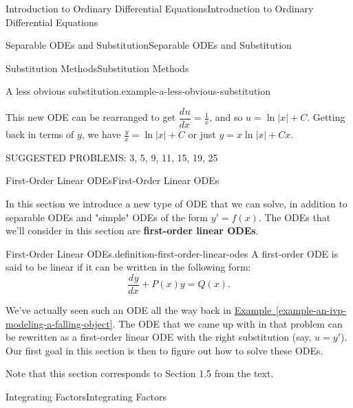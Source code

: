 \documentclass[10pt,]{book}
\newcommand{\terminology}[1]{\textbf{#1}}
\numberwithin{equation}{section}
\newcommand{\dv}[3][]{\dfrac{d^{#1} #2}{d #3^{#1}}}
\begin{document}
\begin{chapterptx}{Introduction to Ordinary Differential Equations}{}{Introduction to Ordinary Differential Equations}{}{}
\begin{sectionptx}{Separable ODEs and Substitution}{}{Separable ODEs and Substitution}{}{}
\begin{subsectionptx}{Substitution Methods}{}{Substitution Methods}{}{}
\begin{example}{A less obvious substitution.}{example-a-less-obvious-substitution}
%
\par
\hypertarget{p-69}{}%
This new ODE can be rearranged to get \(\dv{u}{x} = \frac{1}{x}\), and so \(u = \ln|x|+C\). Getting back in terms of \(y\), we have \(\frac{y}{x} = \ln|x|+C\) or just \(y = x\ln|x|+Cx\).%
\end{example}
\end{subsectionptx}
\begin{conclusion}{}%
\hypertarget{p-70}{}%
SUGGESTED PROBLEMS: 3, 5, 9, 11, 15, 19, 25%
\end{conclusion}%
\end{sectionptx}
%
%
\typeout{************************************************}
\typeout{************************************************}
%
\begin{sectionptx}{First-Order Linear ODEs}{}{First-Order Linear ODEs}{}{}\label{section-first-order-linear-odes}
\begin{introduction}{}%
\hypertarget{p-71}{}%
In this section we introduce a new type of ODE that we can solve, in addition to separable ODEs and "simple" ODEs of the form \(y'=f(x)\). The ODEs that we'll consider in this section are \terminology{first-order linear ODEs}.%
\begin{definition}{First-Order Linear ODEs.}{definition-first-order-linear-odes}%
\hypertarget{p-72}{}%
A first-order ODE is said to be linear if it can be written in the following form:%
\begin{equation*}
\dv{y}{x} + P(x)y = Q(x).
\end{equation*}
%
\end{definition}
\hypertarget{p-73}{}%
We've actually seen such an ODE all the way back in \hyperref[example-an-ivp-modeling-a-falling-object]{Example~\ref{example-an-ivp-modeling-a-falling-object}}. The ODE that we came up with in that problem can be rewritten as a first-order linear ODE with the right substitution (say, \(u = y'\)). Our first goal in this section is then to figure out how to solve these ODEs.%
\par
\hypertarget{p-74}{}%
Note that this section corresponds to Section 1.5 from the text.%
\end{introduction}%
%
%
\typeout{************************************************}
\typeout{************************************************}
%
\begin{subsectionptx}{Integrating Factors}{}{Integrating Factors}{}{}\label{subsection-integrating-factors}

\end{subsectionptx}
\end{sectionptx}
\end{chapterptx}
\end{document}
